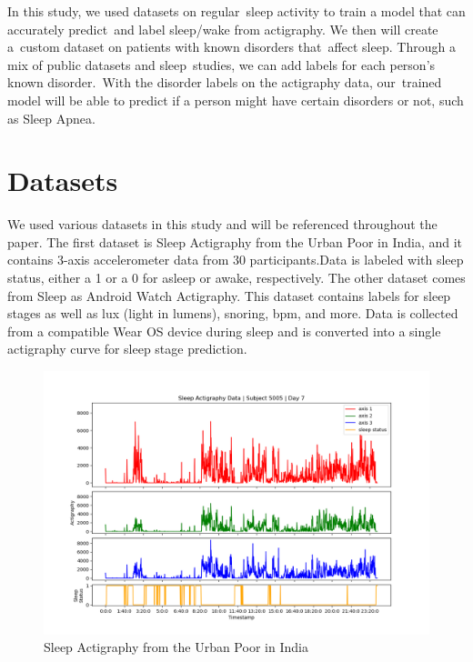 \documentclass[12pt]{report}
\begin{document}
In this study, we used datasets on regular sleep activity to train a model that can accurately predict and label sleep/wake from actigraphy. We then will create a custom dataset on patients with known disorders that affect sleep. Through a mix of public datasets and sleep studies, we can add labels for each person's known disorder. With the disorder labels on the actigraphy data, our trained model will be able to predict if a person might have certain disorders or not, such as Sleep Apnea.

\section{Datasets}

We used various datasets in this study and will be referenced throughout the paper. The first dataset is Sleep Actigraphy from the Urban Poor in India, and it contains 3-axis accelerometer data from 30 participants.Data is labeled with sleep status, either a 1 or a 0 for asleep or awake, respectively. The other dataset comes from Sleep as Android Watch Actigraphy. This dataset contains labels for sleep stages as well as lux (light in lumens), snoring, bpm, and more. Data is collected from a compatible Wear OS device during sleep and is converted into a single actigraphy curve for sleep stage prediction.

\begin{figure}
  \begin{center}
    \includegraphics[width=1\linewidth]{model_test_subject5005_day7}
    \caption{Sleep Actigraphy from the Urban Poor in India\cite{zhang}\cite{bessone}}
    \label{urban-poor}
  \end{center}
\end{figure}
\end{document}
